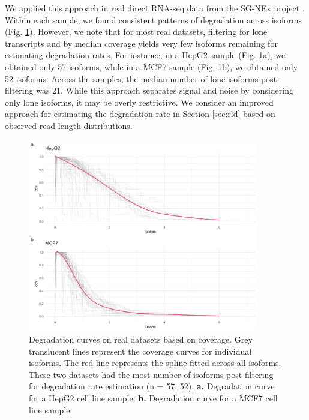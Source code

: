 We applied this approach in real direct RNA-seq data from the SG-NEx project \cite{Chen2021}. Within each sample, we found consistent patterns of degradation across isoforms (Fig. \ref{fig:cov-real}). However, we note that for most real datasets, filtering for lone transcripts and by median coverage yields very few isoforms remaining for estimating degradation rates. For instance, in a HepG2 sample (Fig. \ref{fig:cov-real}a), we obtained only 57 isoforms, while in a MCF7 sample (Fig. \ref{fig:cov-real}b), we obtained only 52 isoforms. Across the samples, the median number of lone isoforms post-filtering was 21. While this approach separates signal and noise by considering only lone isoforms, it may be overly restrictive. We consider an improved approach for estimating the degradation rate in Section \ref{sec:rld} based on observed read length distributions. 

\begin{figure}[H]
    \centering
    \includegraphics[width=0.9\textwidth]{figures/sec-2-cov-real.png}
    \caption[Degradation curves on real datasets based on coverage]{Degradation curves on real datasets based on coverage. Grey translucent lines represent the coverage curves for individual isoforms. The red line represents the spline fitted across all isoforms. These two datasets had the most number of isoforms post-filtering for degradation rate estimation (n = 57, 52). \textbf{a.} Degradation curve for a HepG2 cell line sample. \textbf{b.} Degradation curve for a MCF7 cell line sample.}
    \label{fig:cov-real}
\end{figure}

